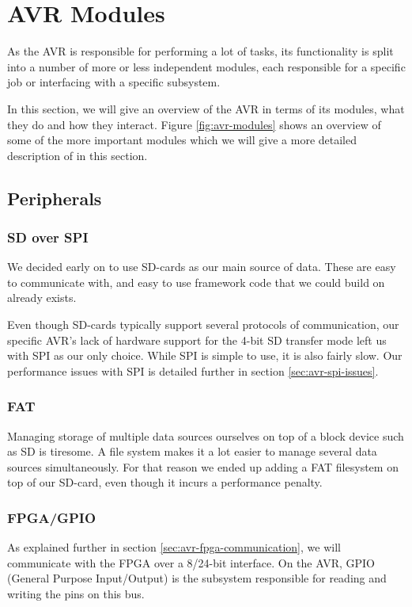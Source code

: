 \section{AVR Modules}
As the AVR is responsible for performing a lot of tasks, its
functionality is split into a number of more or less independent
modules, each responsible for a specific job or interfacing with a
specific subsystem.

In this section, we will give an overview of the AVR in terms of its
modules, what they do and how they interact. Figure
\ref{fig:avr-modules} shows an overview of some of the more important
modules which we will give a more detailed description of in this section.



\subsection{Peripherals}
\subsubsection{SD over SPI}
We decided early on to use SD-cards as our main source of data. These
are easy to communicate with, and easy to use framework code that we
could build on already exists.

Even though SD-cards typically support several protocols of
communication, our specific AVR's lack of hardware support for the 4-bit
SD transfer mode left us with SPI as our only choice. While SPI is
simple to use, it is also fairly slow. Our performance issues with SPI
is detailed further in section \ref{sec:avr-spi-issues}.

\subsubsection{FAT}
Managing storage of multiple data sources ourselves on top of a block
device such as SD is tiresome. A file system makes it a lot easier
to manage several data sources simultaneously. For that reason we ended
up adding a FAT filesystem on top of our SD-card, even though it incurs
a performance penalty. 

\subsubsection{FPGA/GPIO}
As explained further in section \ref{sec:avr-fpga-communication}, we
will communicate with the FPGA over a 8/24-bit interface. On the AVR,
GPIO (General Purpose Input/Output) is the subsystem responsible for
reading and writing the pins on this bus.


